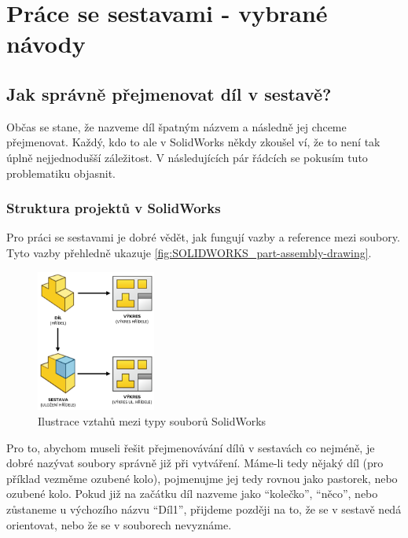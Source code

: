 \newpage

\chapter{Práce se sestavami - vybrané návody}

\section{Jak správně přejmenovat díl v sestavě?}
Občas se stane, že nazveme díl špatným názvem a následně jej chceme přejmenovat.
Každý, kdo to ale v SolidWorks někdy zkoušel ví, že to není tak úplně nejjednodušší záležitost.
V následujících pár řádcích se pokusím tuto problematiku objasnit.

\subsection*{Struktura projektů v SolidWorks}
Pro práci se sestavami je dobré vědět, jak fungují vazby a reference mezi soubory.
Tyto vazby přehledně ukazuje \autoref{fig:SOLIDWORKS_part-assembly-drawing}.
\begin{figure}[htpb]
    \centering
    \includegraphics[width=0.35\textwidth]{img/graphics/png/SOLIDWORKS - PART-ASSEMBLY-DRAWING.png}
    \caption{Ilustrace vztahů mezi typy souborů SolidWorks}
    \label{fig:SOLIDWORKS_part-assembly-drawing}
\end{figure}

Pro to, abychom museli řešit přejmenovávání dílů v sestavách co nejméně, je dobré nazývat soubory správně již při vytváření.
Máme-li tedy nějaký díl (pro příklad vezměme ozubené kolo), pojmenujme jej tedy rovnou jako pastorek, nebo ozubené kolo.
Pokud již na začátku díl nazveme jako \enquote{kolečko}, \enquote{něco}, nebo zůstaneme u výchozího názvu \enquote{Díl1}, přijdeme později na to, že se v sestavě nedá orientovat, nebo že se v souborech nevyznáme.

